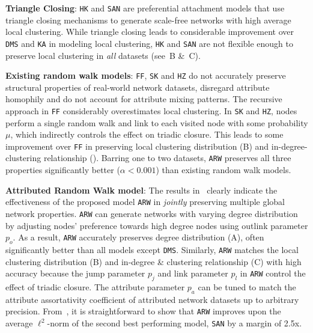 \textbf{Triangle Closing}: \texttt{HK} and \texttt{SAN} are preferential attachment models
that use triangle closing mechanisms to generate scale-free networks with high average
local clustering.
While triangle closing leads to considerable improvement over \texttt{DMS}
and \texttt{KA} in modeling local clustering, \texttt{HK} and \texttt{SAN} are not flexible enough
to preserve local clustering in \textit{all} datasets (see~B \&~C).

\textbf{Existing random walk models}: \texttt{FF}, \texttt{SK} and \texttt{HZ}
do not accurately preserve structural properties of real-world network datasets,
disregard attribute homophily and do not account for attribute mixing patterns.
The recursive approach in \texttt{FF} considerably overestimates local clustering.
In \texttt{SK} and \texttt{HZ}, nodes perform a single random walk and link to
each visited node with some probability $\mu$, which indirectly
controls the effect on triadic closure. This leads to some improvement over \texttt{FF} in preserving local
clustering distribution (B) and in-degree-clustering relationship ().
Barring one to two datasets, \texttt{ARW} preserves all three properties significantly
better ($\alpha < 0.001$) than existing random walk models.

\textbf{Attributed Random Walk model}: The results in~ clearly indicate the effectiveness
of the proposed model \texttt{ARW} in \textit{jointly} preserving multiple
global network properties. \texttt{ARW} can generate networks with varying
degree distribution by adjusting nodes' preference towards high degree nodes
using outlink parameter $p_o$. As a result, \texttt{ARW} accurately preserves
degree distribution (A), often significantly better
than all models except \texttt{DMS}. Similarly, \texttt{ARW} matches the local clustering
distribution  (B) and in-degree \& clustering relationship
(C) with high accuracy because the jump parameter $p_j$ and
link parameter $p_l$ in \texttt{ARW} control the effect of triadic closure.
The attribute parameter $p_a$ can be tuned to match the attribute assortativity
coefficient of attributed network datasets up to arbitrary precision.
From~, it is straightforward to show that
\texttt{ARW} improves upon the average $\ell^2$-norm of the second best performing model,
\texttt{SAN} by a margin of 2.5x.


